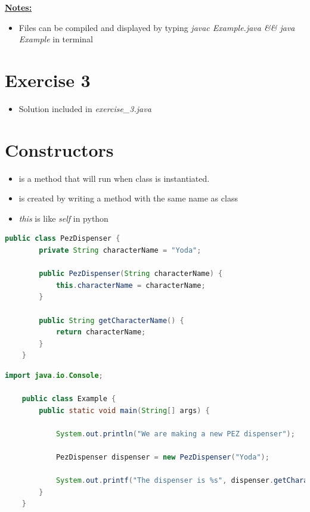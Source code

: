 \documentclass[12pt]{article}
\begin{document}
    \bigskip

    \underline{\textbf{Notes:}}

    \bigskip

    \begin{itemize}
        \item Files can be compiled and displayed by typing \textit{javac Example.java \&\& java Example}
        in terminal
    \end{itemize}

\bigskip

\section{Exercise 3}

\bigskip

\begin{itemize}
    \item Solution included in \textit{exercise\_3.java}
\end{itemize}

\bigskip

\section{Constructors}

\bigskip

\begin{itemize}
    \item is a method that will run when class is instantiated.
    \item is created by writing a method with the same name as class
    \item \textit{this} is like \textit{self} in python
\end{itemize}


    \begin{lstlisting}[language=Java,caption={lesson\_9/PezDispenser.java}]
    public class PezDispenser {
        private String characterName = "Yoda";

        public PezDispenser(String characterName) {
            this.characterName = characterName;
        }

        public String getCharacterName() {
            return characterName;
        }
    }
    \end{lstlisting}

    \bigskip

    \begin{lstlisting}[language=Java,caption={lesson\_9/Example.java}]
    import java.io.Console;

    public class Example {
        public static void main(String[] args) {

            System.out.println("We are making a new PEZ dispenser");

            PezDispenser dispenser = new PezDispenser("Yoda");

            System.out.printf("The dispenser is %s", dispenser.getCharacterName()); // <- 2. And is used here
        }
    }
    \end{lstlisting}
\end{document}
